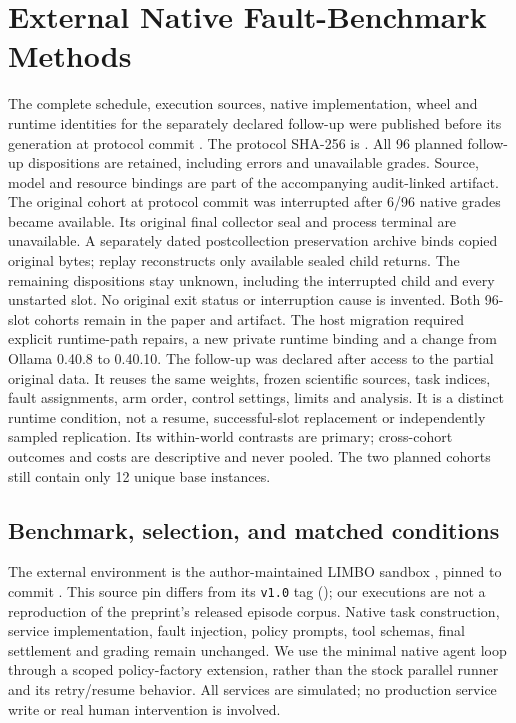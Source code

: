 \section{External Native Fault-Benchmark Methods}
\label{sec:limbo}

The complete schedule, execution sources, native implementation, wheel and runtime identities for the separately declared follow-up were published before its generation at protocol commit \texttt{}. The protocol SHA-256 is \texttt{}. All 96 planned follow-up dispositions are retained, including errors and unavailable grades. Source, model and resource bindings are part of the accompanying audit-linked artifact. The original cohort at protocol commit \texttt{} was interrupted after 6/96 native grades became available. Its original final collector seal and process terminal are unavailable. A separately dated postcollection preservation archive binds copied original bytes; replay reconstructs only available sealed child returns. The remaining dispositions stay unknown, including the interrupted child and every unstarted slot. No original exit status or interruption cause is invented. Both 96-slot cohorts remain in the paper and artifact. The host migration required explicit runtime-path repairs, a new private runtime binding and a change from Ollama 0.40.8 to 0.40.10. The follow-up was declared after access to the partial original data. It reuses the same weights, frozen scientific sources, task indices, fault assignments, arm order, control settings, limits and analysis. It is a distinct runtime condition, not a resume, successful-slot replacement or independently sampled replication. Its within-world contrasts are primary; cross-cohort outcomes and costs are descriptive and never pooled. The two planned cohorts still contain only 12 unique base instances.

\subsection{Benchmark, selection, and matched conditions}

The external environment is the author-maintained LIMBO sandbox
\cite{limbo,limbosource}, pinned to commit
\texttt{}. This source pin
differs from its \texttt{v1.0} tag
(\texttt{}); our executions
are not a reproduction of the preprint's released episode corpus. Native task
construction, service implementation, fault injection, policy prompts, tool
schemas, final settlement and grading remain unchanged. We use the minimal
native agent loop through a scoped policy-factory extension, rather than the
stock parallel runner and its retry/resume behavior. All services are simulated;
no production service write or real human intervention is involved.


